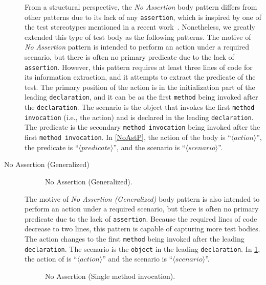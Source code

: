 \documentclass[proposal.tex]{subfiles}
\begin{document}
\begin{description}
From a structural perspective, the \textit{No Assertion} body pattern differs from other patterns due to its lack of any \texttt{assertion}, which is inspired by one of the test stereotypes mentioned in a recent work~\cite{li2018aiding}.
%
Nonetheless, we greatly extended this type of test body as the following patterns.
%
The motive of \textit{No Assertion} pattern is intended to perform an action under a required scenario, but there is often no primary predicate due to the lack of \texttt{assertion}.
%
However, this pattern requires at least three lines of code for its information extraction, and it attempts to extract the predicate of the test.
%
The primary position of the action is in the initialization part of the leading \texttt{declaration}, and it can be as the first \texttt{method} being invoked after the \texttt{declaration}.
%
The scenario is the object that invokes the first \texttt{method invocation} (i.e., the action) and is declared in the leading \texttt{declaration}.
%
The predicate is the secondary \texttt{method invocation} being invoked after the first \texttt{method invocation}.
%
In \cref{NoAstP}, the action of the body is \enquote{$\langle action \rangle$}, the predicate is \enquote{$\langle predicate \rangle$}, and the scenario is \enquote{$\langle scenario \rangle$}.


\item[No Assertion (Generalized)] 

\begin{figure}[t]
\centering
    \begin{subfigure}{0.7\textwidth}
    \end{subfigure}
\caption{No Assertion (Generalized).}
\label{NoAstP_any}
\end{figure}

The motive of \textit{No Assertion (Generalized)} body pattern is also intended to perform an action under a required scenario, but there is often no primary predicate due to the lack of \texttt{assertion}.
%
Because the required lines of code decrease to two lines, this pattern is capable of capturing more test bodies.
%
The action changes to the first \texttt{method} being invoked after the leading \texttt{declaration}.
%
The scenario is the \texttt{object} in the leading \texttt{declaration}.
%
In \cref{NoAstP_any}, the action of is \enquote{$\langle action \rangle$} and the scenario is \enquote{$\langle scenario \rangle$}.

\begin{figure}[t]
\centering
    \begin{subfigure}{0.45\textwidth}
    \end{subfigure}
\caption{No Assertion (Single method invocation).}
\label{NoAstP_MC}
\end{figure}



\end{description}
\end{document}
